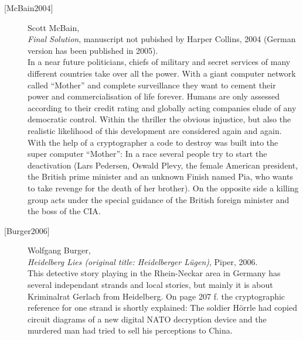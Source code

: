 \begin{description}
\item[\textrm{[McBain2004]}] 
    Scott McBain, \\
    {\em Final Solution}, manuscript not pubished by Harper Collins, 2004
    (German version has been published in 2005). \\
    In a near future politicians, chiefs of military and secret services of
    many different countries take over all the power. With a giant computer
    network called ``Mother'' and complete surveillance they want to cement
    their power and commercialisation of life forever.
    Humans are only assessed according to their credit rating and globally
    acting companies elude of any democratic control.
    Within the thriller the obvious injustice, but also the realistic
    likelihood of this development are considered again and again.\\
    With the help of a cryptographer a code to destroy was built into the
    super computer ``Mother'': In a race several people try to start the
    deactivation (Lars Pedersen, Oswald Plevy, the female American president,
    the British prime minister and an unknown Finish named Pia, who wants to
    take revenge for the death of her brother). On the opposite side a killing
    group acts under the special guidance of the British foreign minister and
    the boss of the CIA.\\


\item[\textrm{[Burger2006]}] 
    Wolfgang Burger, \\
    {\em Heidelberg Lies (original title: Heidelberger L\"ugen)}, Piper, 2006. \\
    This detective story playing in the Rhein-Neckar area in Germany has
    several independant strands and local stories, but mainly it is
    about Kriminalrat Gerlach from Heidelberg. On page 207 f. the
    cryptographic reference for one strand is shortly explained: The
    soldier H\"orrle had copied circuit diagrams of a new digital NATO
    decryption device and the murdered man had tried to sell his perceptions
    to China.\\




\end{description}
